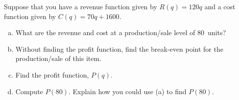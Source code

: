 \documentclass[11pt,letterpaper]{article}
\begin{document}
\newpage



 Suppose that you have a revenue function given by $R(q)= 120q$ and a cost function given by $C(q)= 70q + 1600$. 
	\begin{enumerate}[(a)]
	\item What are the revenue and cost at a production/sale level of 80~units?
	\item Without finding the profit function, find the break-even point for the production/sale of this item.
	\item Find the profit function, $P(q)$.
	\item Compute $P(80)$. Explain how you could use (a) to find $P(80)$. 
	\end{enumerate}
\end{document}
